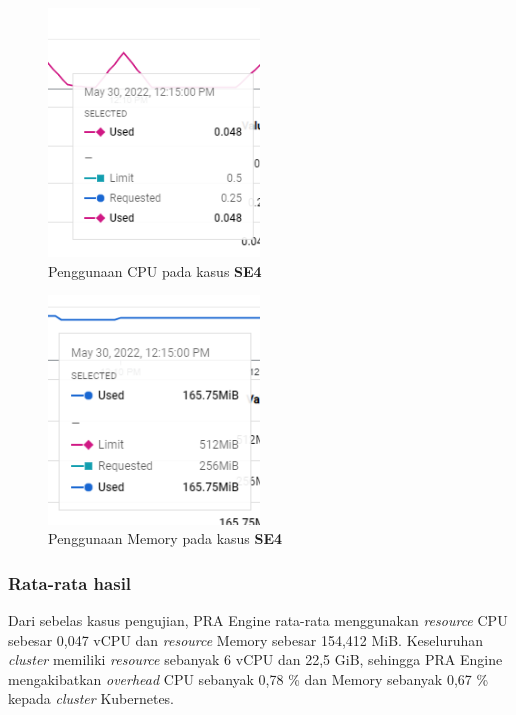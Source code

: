 \begin{figure}[!htb]
	\centering
	\includegraphics[width=0.5\textwidth]{resources/ch4/resource/11-cpu.png}
	\caption{Penggunaan CPU pada kasus \textbf{SE4}}
	\label{result_cpu_11}
\end{figure}

\begin{figure}[!htb]
	\centering
	\includegraphics[width=0.5\textwidth]{resources/ch4/resource/11-mem.png}
	\caption{Penggunaan Memory pada kasus \textbf{SE4}}
	\label{result_mem_11}
\end{figure}

\pagebreak

\subsubsection{Rata-rata hasil}
Dari sebelas kasus pengujian, PRA Engine rata-rata menggunakan \textit{resource} CPU sebesar 0,047 vCPU dan \textit{resource} Memory sebesar 154,412 MiB. Keseluruhan \textit{cluster} memiliki \textit{resource} sebanyak 6 vCPU dan 22,5 GiB, sehingga PRA Engine mengakibatkan \textit{overhead} CPU sebanyak 0,78 \% dan Memory sebanyak 0,67 \% kepada \textit{cluster} Kubernetes.

